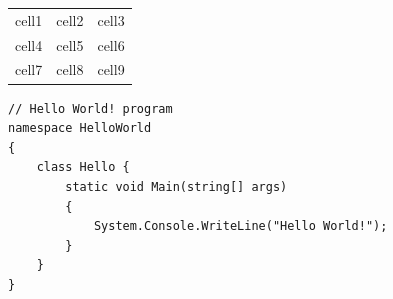 \documentclass[slovak, master]{diploma}
\begin{document}
\begin{center}
\begin{tabular}{ c c c }
 cell1 & cell2 & cell3 \\ 
 cell4 & cell5 & cell6 \\  
 cell7 & cell8 & cell9    
\end{tabular}
\end{center}

\begin{lstlisting}[label=src:Test,caption={Test}]
// Hello World! program
namespace HelloWorld
{
    class Hello {         
        static void Main(string[] args)
        {
            System.Console.WriteLine("Hello World!");
        }
    }
}
\end{lstlisting}

%

\printbibliography[title={Literatúra}, heading=bibintoc]
\end{document}
